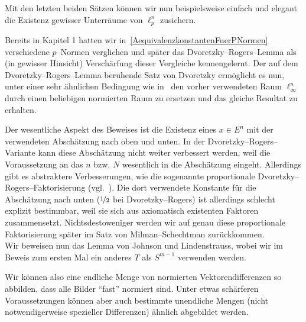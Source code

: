 \documentclass[a4paper]{report}
\numberwithin[\roman]{equation}{sat}
\begin{document}


Mit den letzten beiden Sätzen können wir nun beispielsweise einfach und
elegant die Existenz gewisser Unterräume von $\ell_p^n$ zusichern.


\parag
Bereits in Kapitel 1 hatten wir in~\ref{AequivalenzkonstantenFuerPNormen}
verschiedene $p$--Normen verglichen und später das Dvoretzky--Rogers--Lemma
als (in gewisser Hinsicht) Verschärfung dieser Vergleiche kennengelernt.
Der auf dem Dvoretzky--Rogers--Lemma beruhende Satz von Dvoretzky ermöglicht es nun,
unter einer sehr ähnlichen Bedingung wie in~ den
vorher verwendeten Raum $\ell_\infty^n$ durch einen beliebigen normierten Raum
zu ersetzen und das gleiche Resultat zu erhalten.


\parag
Der wesentliche Aspekt des Beweises ist die Existenz eines $x \in E^n$ mit
der verwendeten Abschätzung nach oben und unten.
In der Dvoretzky--Rogers--Variante kann diese Abschätzung nicht weiter verbessert werden,
weil die Voraussetzung an das $n$ bzw. $N$ wesentlich in die Abschätzung eingeht.
Allerdings gibt es abstraktere Verbesserungen, wie die
sogenannte proportionale Dvoretzky--Rogers--Faktorisierung (vgl.~\cite{BS}).
Die dort verwendete Konstante für die Abschätzung nach unten
($\nicefrac 12$ bei Dvoretzky--Rogers) ist allerdings schlecht explizit bestimmbar, weil sie
sich aus axiomatisch existenten Faktoren zusammensetzt.
Nichtsdestoweniger
werden wir auf genau diese proportionale Faktorisierung später im Satz von
Milman--Schechtman zurückkommen.\\
Wir beweisen nun das Lemma von Johnson und Lindenstrauss, wobei wir im Beweis
zum ersten Mal ein anderes $T$ als $S^{m-1}$ verwenden werden.


\parag
Wir können also eine endliche Menge von normierten Vektorendifferenzen so
abbilden, dass alle Bilder \enquote{fast} normiert sind.
Unter etwas schärferen Voraussetzungen können aber auch bestimmte unendliche Mengen (nicht
notwendigerweise spezieller Differenzen) ähnlich abgebildet werden.
\end{document}
